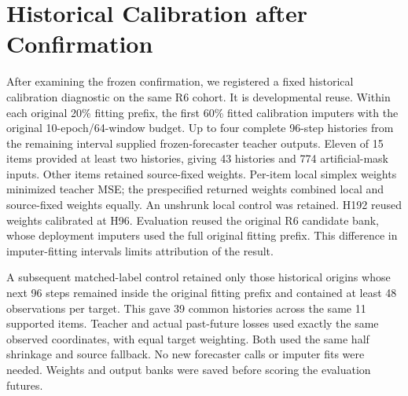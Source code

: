 \section{Historical Calibration after Confirmation}
\label{app:prefix_calibration}
After examining the frozen confirmation, we registered a fixed historical calibration diagnostic on the same R6 cohort. It is developmental reuse. Within each original 20\% fitting prefix, the first 60\% fitted calibration imputers with the original 10-epoch/64-window budget. Up to four complete 96-step histories from the remaining interval supplied frozen-forecaster teacher outputs. Eleven of 15 items provided at least two histories, giving 43 histories and 774 artificial-mask inputs. Other items retained source-fixed weights. Per-item local simplex weights minimized teacher MSE; the prespecified returned weights combined local and source-fixed weights equally. An unshrunk local control was retained. H192 reused weights calibrated at H96. Evaluation reused the original R6 candidate bank, whose deployment imputers used the full original fitting prefix. This difference in imputer-fitting intervals limits attribution of the result.

A subsequent matched-label control retained only those historical origins whose next 96 steps remained inside the original fitting prefix and contained at least 48 observations per target. This gave 39 common histories across the same 11 supported items. Teacher and actual past-future losses used exactly the same observed coordinates, with equal target weighting. Both used the same half shrinkage and source fallback. No new forecaster calls or imputer fits were needed. Weights and output banks were saved before scoring the evaluation futures.

